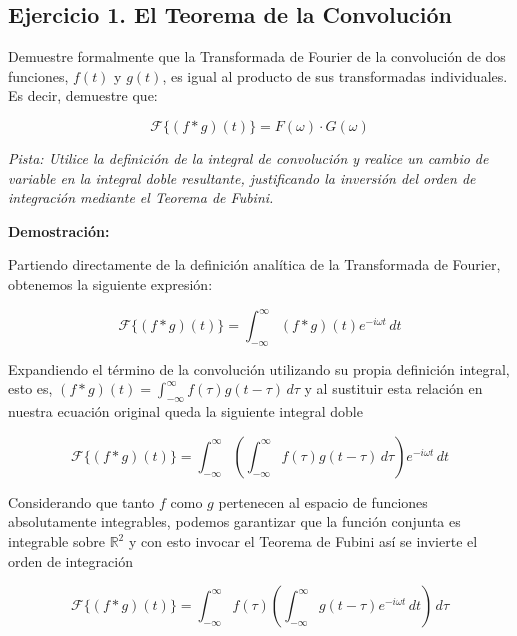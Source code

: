 \subsection*{Ejercicio 1. El Teorema de la Convolución}

Demuestre formalmente que la Transformada de Fourier de la convolución de dos funciones, $f(t)$ y $g(t)$, es igual al producto de sus transformadas individuales. Es decir, demuestre que:

\begin{equation}
\mathcal{F}\{(f * g)(t)\} = F(\omega) \cdot G(\omega)
\end{equation}

\textit{Pista: Utilice la definición de la integral de convolución y realice un cambio de variable en la integral doble resultante, justificando la inversión del orden de integración mediante el Teorema de Fubini.}

\vspace{0.5cm}

\textbf{Demostración:}

Partiendo directamente de la definición analítica de la Transformada de Fourier, obtenemos la siguiente expresión:

\begin{equation}
    \mathcal{F}\{(f * g)(t)\} = \int_{-\infty}^{\infty} (f * g)(t) e^{-i\omega t} \, dt
\end{equation}

Expandiendo el término de la convolución utilizando su propia definición integral, esto es, $(f * g)(t) = \int_{-\infty}^{\infty} f(\tau) g(t - \tau) \, d\tau$ y al sustituir esta relación en nuestra ecuación original queda la siguiente integral doble

\begin{equation}
    \mathcal{F}\{(f * g)(t)\} = \int_{-\infty}^{\infty} \left( \int_{-\infty}^{\infty} f(\tau) g(t - \tau) \, d\tau \right) e^{-i\omega t} \, dt
\end{equation}

Considerando que tanto $f$ como $g$ pertenecen al espacio de funciones absolutamente integrables, podemos garantizar que la función conjunta es integrable sobre $\mathbb{R}^2$ y con esto invocar el Teorema de Fubini así se invierte el orden de integración

\begin{equation}
    \mathcal{F}\{(f * g)(t)\} = \int_{-\infty}^{\infty} f(\tau) \left( \int_{-\infty}^{\infty} g(t - \tau) e^{-i\omega t} \, dt \right) \, d\tau
\end{equation}

